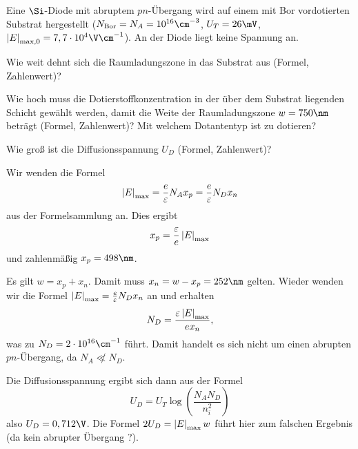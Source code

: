 \documentclass{article}
\begin{document}
\begin{exercise}
Eine $\Si$-Diode mit abruptem $pn$-Übergang wird auf einem mit Bor vordotierten Substrat hergestellt ($N_{\textrm{Bor}}=N_A=10^{16}\cm^{-3}$, $U_T=26\mV$, $\abs{E}_{\max,0}=\float{7,7}{4}\V\cm^{-1}$). An der Diode liegt keine Spannung an.
\begin{tasks}
        \item Wie weit dehnt sich die Raumladungszone in das Substrat aus (Formel, Zahlenwert)? 
        \item Wie hoch muss die Dotierstoffkonzentration in der über dem Substrat liegenden Schicht gewählt werden, damit die Weite der Raumladungszone $w=750\nm$ beträgt (Formel, Zahlenwert)? Mit welchem Dotantentyp ist zu dotieren?
    \item Wie groß ist die Diffusionsspannung $U_D$ (Formel, Zahlenwert)? 
\end{tasks}
\end{exercise}

\begin{solution}
    \begin{tasks}
            \item Wir wenden die Formel
        $$
        \left|E\right|_{\max}=\frac e {\varepsilon} N_A x_p=\frac e {\varepsilon} N_D x_n
        $$
        aus der Formelsammlung an. Dies ergibt
        $$
        x_p=\frac {\varepsilon} e \left|E\right|_{\max}
        $$
        und zahlenmäßig $x_p=498\nm$.
            \item Es gilt $w=x_p+x_n$. Damit muss $x_n=w-x_p=252\nm$ gelten.
        Wieder wenden wir die Formel $\left|E\right|_{\max}=\frac e {\varepsilon} N_D x_n$ an und erhalten
        $$
        N_D= \frac {\varepsilon\left|E\right|_{\max}}{ex_n},
        $$
        was zu $N_D=\float{2}{16}\cm^{-1}$ führt. Damit handelt es sich nicht um einen abrupten $pn$-Übergang, da $N_A\not\ll N_D$.
            \item Die Diffusionsspannung ergibt sich dann aus der Formel
        $$
        U_D=U_T\log\left(\frac{N_A N_D}{n_i^2}\right)
        $$
        also $U_D=0,712\V$. Die Formel $2U_D=\left|E\right|_{\max}w$ führt hier zum falschen Ergebnis (da kein abrupter Übergang ?).
    \end{tasks}
\end{solution}
\end{document}
